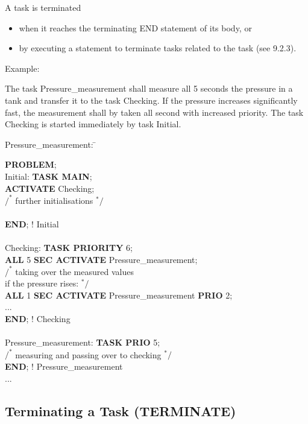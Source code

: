 A task is terminated
\begin{itemize}
\item when it reaches the terminating END statement of its body, or
\item by executing a statement to terminate tasks related to the task
(see 9.2.3).
\end{itemize}

Example:

The task Pressure\_measurement shall measure all 5 seconds the pressure in a tank and transfer it to the task Checking. If the pressure increases significantly fast, the measurement shall by taken all second with increased priority. The task Checking is started immediately by task Initial.

\begin{tabbing}
\x Pressure\_measurement: \= \kill

{\bf PROBLEM}; \> \\
\x Initial:    \> {\bf TASK MAIN};\\
        \> {\bf ACTIVATE} Checking;\\
        \> \x $/^*$ further initialisations $^*/$ \\
        \> \\
        \> {\bf END}; ! Initial\\
        \> \\
\x Checking:   \> {\bf TASK PRIORITY} 6;\\
        \> {\bf ALL} 5 {\bf SEC ACTIVATE} Pressure\_measurement;\\
        \> \x $/^*$ taking over the measured values\\
        \> \x if the pressure rises: $^*/$\\
        \> {\bf ALL} 1 {\bf SEC ACTIVATE} Pressure\_measurement {\bf PRIO} 2;\\
        \> ...\\
        \> {\bf END}; ! Checking\\
        \> \\
\x Pressure\_measurement: \> {\bf TASK PRIO} 5;\\
    \> $/^*$ measuring and passing over to checking $^*/$\\
    \> {\bf END}; ! Pressure\_measurement\\
\x ... \>
\end{tabbing}



\subsection{Terminating a Task (TERMINATE)}    %

